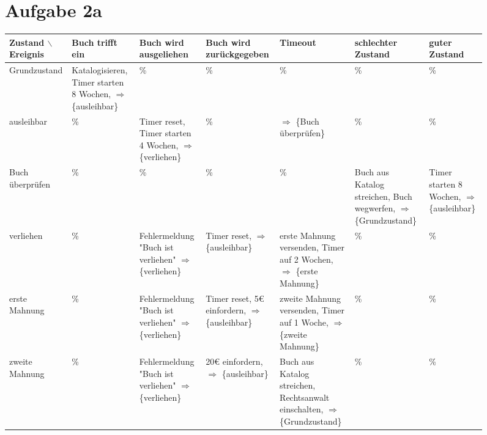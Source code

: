 \documentclass[koma,a4paper,10pt]{org-article}
\begin{document}
\begin{sidewaysfigure}
\section{Aufgabe 2a}
\label{sec-2}
\begin{center}
\begin{tabular}{|p{3cm}|p{3cm}|p{3cm}|p{3cm}|p{3cm}|p{3cm}|p{3cm}|}
Zustand $\backslash$ Ereignis & Buch trifft ein & Buch wird ausgeliehen & Buch wird zurückgegeben & Timeout & schlechter Zustand & guter Zustand\\
\hline
Grundzustand & Katalogisieren, Timer starten 8 Wochen, $\Rightarrow$ \{ausleihbar\} & \% & \% & \% & \% & \%\\
ausleihbar & \% & Timer reset, Timer starten 4 Wochen, $\Rightarrow$ \{verliehen\} & \% & $\Rightarrow$ \{Buch überprüfen\} & \% & \%\\
Buch überprüfen & \% & \% & \% & \% & Buch aus Katalog streichen, Buch wegwerfen, $\Rightarrow$ \{Grundzustand\} & Timer starten 8 Wochen, $\Rightarrow$ \{ausleihbar\}\\
verliehen & \% & Fehlermeldung "Buch ist verliehen" $\Rightarrow$ \{verliehen\} & Timer reset, $\Rightarrow$ \{ausleihbar\} & erste Mahnung versenden, Timer auf 2 Wochen, $\Rightarrow$ \{erste Mahnung\} & \% & \%\\
erste Mahnung & \% & Fehlermeldung "Buch ist verliehen" $\Rightarrow$ \{verliehen\} & Timer reset, 5€ einfordern, $\Rightarrow$ \{ausleihbar\} & zweite Mahnung versenden, Timer auf 1 Woche, $\Rightarrow$ \{zweite Mahnung\} & \% & \%\\
zweite Mahnung & \% & Fehlermeldung "Buch ist verliehen" $\Rightarrow$ \{verliehen\} & 20€ einfordern, $\Rightarrow$ \{ausleihbar\} & Buch aus Katalog streichen, Rechtsanwalt einschalten, $\Rightarrow$ \{Grundzustand\} & \% & \%\\
\end{tabular}
\end{center}
\end{sidewaysfigure}
\end{document}
